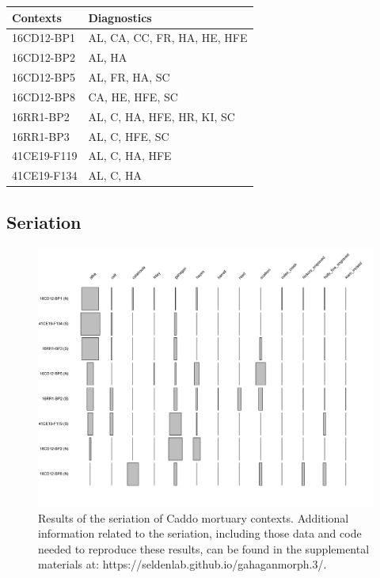\documentclass[]{interact}
\theoremstyle{plain}%
\theoremstyle{definition}
\theoremstyle{remark}
\begin{document}
\begin{table}
{\begin{tabular}{ll} \toprule
Contexts & Diagnostics \\
\midrule
16CD12-BP1 & AL, CA, CC, FR, HA, HE, HFE \\
16CD12-BP2 & AL, HA \\
16CD12-BP5 & AL, FR, HA, SC \\
16CD12-BP8 & CA, HE, HFE, SC \\
16RR1-BP2 & AL, C, HA, HFE, HR, KI, SC \\
16RR1-BP3 & AL, C, HFE, SC \\
41CE19-F119 & AL, C, HA, HFE \\
41CE19-F134 & AL, C, HA \\
\bottomrule
\end{tabular}}
\label{sample-table}
\end{table}

\hypertarget{seriation}{%
\subsection{Seriation}\label{seriation}}

\begin{figure}

{\centering \includegraphics[width=0.8\linewidth]{img/fig03} 

}

\caption{Results of the seriation of Caddo mortuary contexts. Additional information related to the seriation, including those data and code needed to reproduce these results, can be found in the supplemental materials at: https://seldenlab.github.io/gahaganmorph.3/.}\label{fig:h1a}
\end{figure}
\end{document}
